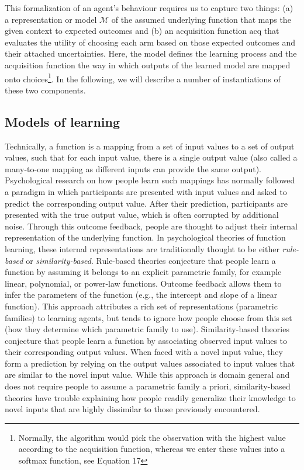 \documentclass[a4paper,natbib]{apa6}
\begin{document}
This formalization of an agent's behaviour requires us to capture two things: (a) a representation or model $\mathcal{M}$ of the assumed underlying function that maps the given context to expected outcomes and (b) an acquisition function $\text{acq}$ that evaluates the utility of choosing each arm based on those expected outcomes and their attached uncertainties. Here, the model defines the learning process and the acquisition function the way in which outputs of the learned model are mapped onto choices\footnote{Normally, the algorithm would pick the observation with the highest value according to the acquisition function, whereas we enter these values into a softmax function, see Equation 17}. In the following, we will describe a number of instantiations of these two components.


\subsection{Models of learning}

Technically, a function is a mapping from a set of input values to a set of output values, such that for each input value, there is a single output value (also called a many-to-one mapping as different inputs can provide the same output). Psychological research on how people learn such mappings has normally followed a paradigm in which participants are presented with input values and asked to predict the corresponding output value. After their prediction, participants are presented with the true output value, which is often corrupted by additional noise. Through this outcome feedback, people are thought to adjust their internal representation of the underlying function. In psychological theories of function learning, these internal representations are traditionally thought to be either \emph{rule-based} or \emph{similarity-based}. Rule-based theories \citep[e.g.,][]{carroll1963functional,koh1991function} conjecture that people learn a function by assuming it belongs to an explicit parametric family, for example linear, polynomial, or power-law functions. Outcome feedback allows them to infer the parameters of the function (e.g., the intercept and slope of a linear function). This approach attributes a rich set of representations (parametric families) to learning agents, but tends to ignore how people choose from this set (how they determine which parametric family to use). Similarity-based theories \citep[e.g.,][]{busemeyer1997learning} conjecture that people learn a function by associating observed input values to their corresponding output values. When faced with a novel input value, they form a prediction by relying on the output values associated to input values that are similar to the novel input value. While this approach is domain general and does not require people to assume a parametric family a priori, similarity-based theories have trouble explaining how people readily generalize their knowledge to novel inputs that are highly dissimilar to those previously encountered.
\end{document}

